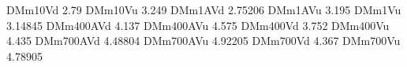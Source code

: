 DMm10Vd 2.79
DMm10Vu 3.249
DMm1AVd 2.75206
DMm1AVu 3.195
DMm1Vu 3.14845
DMm400AVd 4.137
DMm400AVu 4.575
DMm400Vd 3.752
DMm400Vu 4.435
DMm700AVd 4.48804
DMm700AVu 4.92205
DMm700Vd 4.367
DMm700Vu 4.78905
